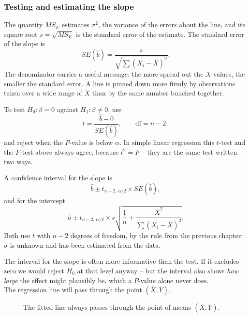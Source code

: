 \documentclass[11pt,a4paper]{article}
\theoremstyle{definition}
\begin{document}
\subsubsection{Testing and estimating the slope}

The quantity $MS_E$ estimates $\sigma^2$, the variance of the errors about the line, and
its square root $s=\sqrt{MS_E}$ is the standard error of the estimate. The standard error
of the slope is
\[SE(\hat{b})=\frac{s}{\sqrt{\sum(X_i-\overline{X})^2}}.\]
The denominator carries a useful message: the more spread out the $X$ values, the smaller
the standard error. A line is pinned down more firmly by observations taken over a wide
range of $X$ than by the same number bunched together.

To test $H_0:\beta=0$ against $H_1:\beta\neq 0$, use
\[t=\frac{\hat{b}-0}{SE(\hat{b})}, \qquad \text{df}=n-2,\]
and reject when the $P$-value is below $\alpha$. In simple linear regression this $t$-test
and the $F$-test above always agree, because $t^2=F$ -- they are the same test written two
ways.

A confidence interval for the slope is
\[\hat{b}\pm t_{n-2,\,\alpha/2}\times SE(\hat{b}),\]
and for the intercept
\[\hat{a}\pm t_{n-2,\,\alpha/2}\times s\sqrt{\frac{1}{n}+\frac{\overline{X}^2}{\sum(X_i-\overline{X})^2}}.\]
Both use $t$ with $n-2$ degrees of freedom, by the rule from the previous chapter: $\sigma$
is unknown and has been estimated from the data.

The interval for the slope is often more informative than the test. If it excludes zero we
would reject $H_0$ at that level anyway -- but the interval also shows \emph{how large} the
effect might plausibly be, which a $P$-value alone never does.\\[1ex] The regression line will pass through the point $(\overline{X},\overline{Y})$.




\begin{figure}[H]
\centering
{}
\caption{The fitted line always passes through the point of means $(\overline{X},\overline{Y})$.}
\end{figure}
\end{document}

